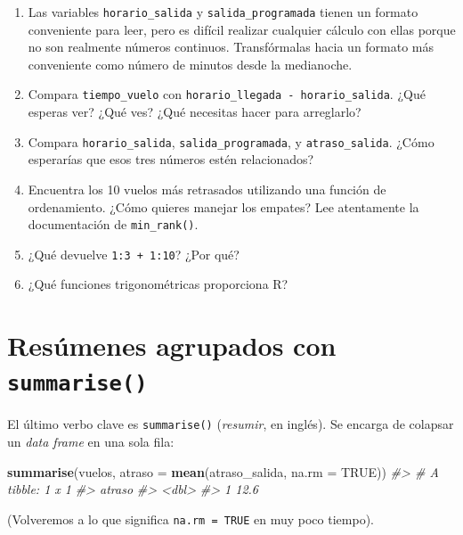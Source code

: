 \documentclass[11pt,oneside]{report}
\newenvironment{Shaded}{\begin{snugshade}}{\end{snugshade}}
\newcommand{\CommentTok}[1]{\textcolor[rgb]{0.56,0.35,0.01}{\textit{#1}}}
\newcommand{\DataTypeTok}[1]{\textcolor[rgb]{0.13,0.29,0.53}{#1}}
\newcommand{\KeywordTok}[1]{\textcolor[rgb]{0.13,0.29,0.53}{\textbf{#1}}}
\newcommand{\NormalTok}[1]{#1}
\newcommand{\OtherTok}[1]{\textcolor[rgb]{0.56,0.35,0.01}{#1}}
\begin{document}
\begin{enumerate}
\def\labelenumi{\arabic{enumi}.}
\item
  Las variables \texttt{horario\_salida} y \texttt{salida\_programada}
  tienen un formato conveniente para leer, pero es difícil realizar
  cualquier cálculo con ellas porque no son realmente números continuos.
  Transfórmalas hacia un formato más conveniente como número de minutos
  desde la medianoche.
\item
  Compara \texttt{tiempo\_vuelo} con
  \texttt{horario\_llegada\ -\ horario\_salida}. ¿Qué esperas ver? ¿Qué
  ves? ¿Qué necesitas hacer para arreglarlo?
\item
  Compara \texttt{horario\_salida}, \texttt{salida\_programada}, y
  \texttt{atraso\_salida}. ¿Cómo esperarías que esos tres números estén
  relacionados?
\item
  Encuentra los 10 vuelos más retrasados utilizando una función de
  ordenamiento. ¿Cómo quieres manejar los empates? Lee atentamente la
  documentación de \texttt{min\_rank()}.
\item
  ¿Qué devuelve \texttt{1:3\ +\ 1:10}? ¿Por qué?
\item
  ¿Qué funciones trigonométricas proporciona R?
\end{enumerate}

\hypertarget{resuxfamenes-agrupados-con-summarise}{%
\section{\texorpdfstring{Resúmenes agrupados con
\texttt{summarise()}}{Resúmenes agrupados con summarise()}}\label{resuxfamenes-agrupados-con-summarise}}

El último verbo clave es \texttt{summarise()} (\emph{resumir}, en
inglés). Se encarga de colapsar un \emph{data frame} en una sola fila:

\begin{Shaded}
\begin{Highlighting}[]
\KeywordTok{summarise}\NormalTok{(vuelos, }\DataTypeTok{atraso =} \KeywordTok{mean}\NormalTok{(atraso_salida, }\DataTypeTok{na.rm =} \OtherTok{TRUE}\NormalTok{))}
\CommentTok{#> # A tibble: 1 x 1}
\CommentTok{#>   atraso}
\CommentTok{#>    <dbl>}
\CommentTok{#> 1   12.6}
\end{Highlighting}
\end{Shaded}

(Volveremos a lo que significa \texttt{na.rm\ =\ TRUE} en muy poco
tiempo).
\end{document}
